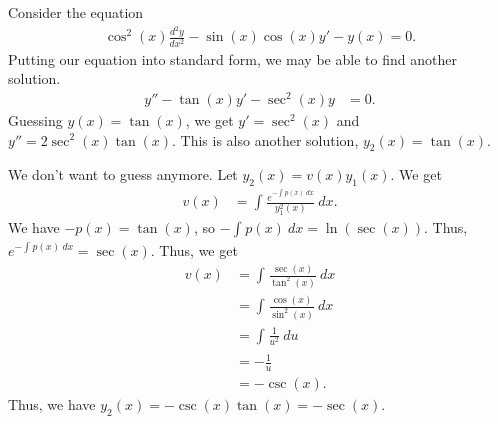 \documentclass[10pt]{mypackage}
\begin{document}
\begin{example}
  Consider the equation
  \begin{align*}
    \cos^2\left(x\right)\frac{d^2y}{dx^2} - \sin(x)\cos(x)y' - y(x) = 0.
  \end{align*}
  Putting our equation into standard form, we may be able to find another solution.
  \begin{align*}
    y'' - \tan(x)y' - \sec^2\left(x\right)y &= 0.
  \end{align*}
  Guessing $y(x) = \tan(x)$, we get $y' = \sec^2\left(x\right)$ and $y'' = 2\sec^2\left(x\right)\tan(x)$. This is also another solution, $y_2(x) = \tan(x)$.\newline

  We don't want to guess anymore. Let $y_2(x) = v(x)y_1(x)$. We get
  \begin{align*}
    v(x) &= \int_{}^{} \frac{e^{-\int_{}^{} p(x)\:dx}}{y_1^2\left(x\right)}\:dx.
  \end{align*}
  We have $-p(x) = \tan(x)$, so $-\int_{}^{} p(x)\:dx = \ln\left(\sec(x)\right)$. Thus, $e^{-\int_{}^{} p(x)\:dx} = \sec(x)$. Thus, we get
  \begin{align*}
    v(x) &= \int_{}^{} \frac{\sec(x)}{\tan^2\left(x\right)}\:dx\\
         &= \int_{}^{} \frac{\cos(x)}{\sin^2\left(x\right)}\:dx\\
         &= \int_{}^{} \frac{1}{u^2}\:du\tag*{$u = \sin(x)$}\\
         &= -\frac{1}{u}\\
         &= -\csc(x).
  \end{align*}
  Thus, we have $y_2(x) = -\csc(x)\tan(x) = -\sec(x)$. 
\end{example}
\end{document}
